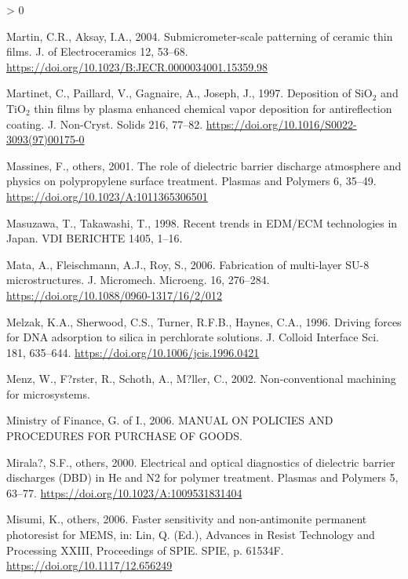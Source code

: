 \documentclass[
  11pt,
  twoside]{article}
\newlength{\cslhangindent}
\newenvironment{CSLReferences}[2] %
 {%
  \setlength{\parindent}{0pt}
  \ifodd #1 \everypar{\setlength{\hangindent}{\cslhangindent}}\ignorespaces\fi
  \ifnum #2 > 0
  \setlength{\parskip}{#2\baselineskip}
  \fi
 }%
 {}
\begin{document}
\begin{CSLReferences}{1}{0}
\leavevmode\hypertarget{ref-Mart04}{}%
Martin, C.R., Aksay, I.A., 2004. Submicrometer-scale patterning of ceramic thin films. J. of Electroceramics 12, 53--68. \url{https://doi.org/10.1023/B:JECR.0000034001.15359.98}

\leavevmode\hypertarget{ref-Mart1997}{}%
Martinet, C., Paillard, V., Gagnaire, A., Joseph, J., 1997. Deposition of \(\mathrm{SiO_2}\) and \(\mathrm{TiO_2}\) thin films by plasma enhanced chemical vapor deposition for antireflection coating. J. Non-Cryst. Solids 216, 77--82. \url{https://doi.org/10.1016/S0022-3093(97)00175-0}

\leavevmode\hypertarget{ref-Mass01}{}%
Massines, F., others, 2001. The role of dielectric barrier discharge atmosphere and physics on polypropylene surface treatment. Plasmas and Polymers 6, 35--49. \url{https://doi.org/10.1023/A:1011365306501}

\leavevmode\hypertarget{ref-Masu1998}{}%
Masuzawa, T., Takawashi, T., 1998. {Recent trends in EDM/ECM technologies in Japan}. VDI BERICHTE 1405, 1--16.

\leavevmode\hypertarget{ref-Mata06}{}%
Mata, A., Fleischmann, A.J., Roy, S., 2006. Fabrication of multi-layer {SU-8} microstructures. J. Micromech. Microeng. 16, 276--284. \url{https://doi.org/10.1088/0960-1317/16/2/012}

\leavevmode\hypertarget{ref-Melz1996}{}%
Melzak, K.A., Sherwood, C.S., Turner, R.F.B., Haynes, C.A., 1996. Driving forces for {DNA} adsorption to silica in perchlorate solutions. J. Colloid Interface Sci. 181, 635--644. \url{https://doi.org/10.1006/jcis.1996.0421}

\leavevmode\hypertarget{ref-Menz02}{}%
Menz, W., F?rster, R., Schoth, A., M?ller, C., 2002. Non-conventional machining for microsystems.

\leavevmode\hypertarget{ref-PurchaseManualGOI2006}{}%
Ministry of Finance, G. of I., 2006. MANUAL ON POLICIES AND PROCEDURES FOR PURCHASE OF GOODS.

\leavevmode\hypertarget{ref-Mira00}{}%
Mirala?, S.F., others, 2000. Electrical and optical diagnostics of dielectric barrier discharges {(DBD) in He and N2} for polymer treatment. Plasmas and Polymers 5, 63--77. \url{https://doi.org/10.1023/A:1009531831404}

\leavevmode\hypertarget{ref-TOK06}{}%
Misumi, K., others, 2006. Faster sensitivity and non-antimonite permanent photoresist for {MEMS}, in: Lin, Q. (Ed.), Advances in Resist Technology and Processing XXIII, Proceedings of SPIE. SPIE, p. 61534F. \url{https://doi.org/10.1117/12.656249}


\end{CSLReferences}
\end{document}

